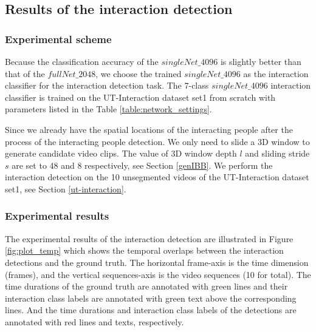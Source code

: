 \subsection{Results of the interaction detection}
\subsubsection*{Experimental scheme}
Because the classification accuracy of the \(singleNet\_4096\) is slightly better than that of the \(fullNet\_2048\), we choose the trained \(singleNet\_4096\) as the interaction classifier for the interaction detection task. The 7-class \(singleNet\_4096\) interaction classifier is trained on the UT-Interaction dataset set1 from scratch with parameters listed in the Table \ref{table:network_settings}. 
\par
Since we already have the spatial locations of the interacting people after the process of the interacting people detection. We only need to slide a 3D window to generate candidate video clips. The value of 3D window depth \(l\) and sliding stride \(s\) are set to 48 and 8 respectively, see Section \ref{genIBB}. We perform the interaction detection on the 10 unsegmented videos of the UT-Interaction dataset set1, see Section \ref{ut-interaction}. 


\subsubsection*{Experimental results}
The experimental results of the interaction detection are illustrated in Figure \ref{fig:plot_temp} which shows the temporal overlaps between the interaction detections and the ground truth. The horizontal frame-axis is the time dimension (frames), and the vertical sequences-axis is the video sequences (10 for total). The time durations of the ground truth are annotated with green lines and their interaction class labels are annotated with green text above the corresponding lines.  And the time durations and interaction class labels of the detections are annotated with red lines and texts, respectively.

